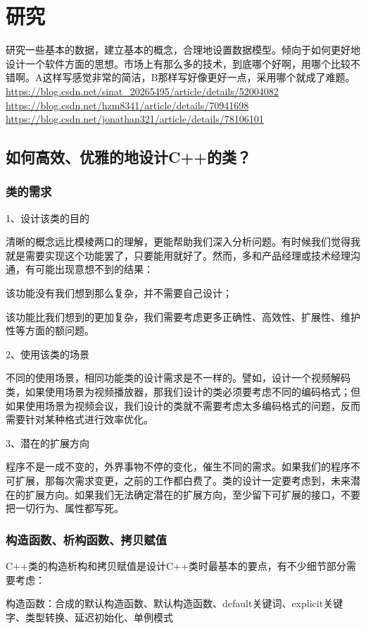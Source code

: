 \chapter{研究}
研究一些基本的数据，建立基本的概念，合理地设置数据模型。倾向于如何更好地设计一个软件方面的思想。市场上有那么多的技术，到底哪个好啊，用哪个比较不错啊。A这样写感觉非常的简洁，B那样写好像更好一点，采用哪个就成了难题。
\url{https://blog.csdn.net/sinat_20265495/article/details/52004082}
\url{https://blog.csdn.net/hzm8341/article/details/70941698}
\url{https://blog.csdn.net/jonathan321/article/details/78106101}

\section{如何高效、优雅的地设计C++的类？}
\subsection{类的需求}
1、设计该类的目的

清晰的概念远比模棱两口的理解，更能帮助我们深入分析问题。有时候我们觉得我就是需要实现这个功能罢了，只要能用就好了。然而，多和产品经理或技术经理沟通，有可能出现意想不到的结果：

该功能没有我们想到那么复杂，并不需要自己设计；

该功能比我们想到的更加复杂，我们需要考虑更多正确性、高效性、扩展性、维护性等方面的额问题。

2、使用该类的场景

不同的使用场景，相同功能类的设计需求是不一样的。譬如，设计一个视频解码类，如果使用场景为视频播放器，那我们设计的类必须要考虑不同的编码格式；但如果使用场景为视频会议，我们设计的类就不需要考虑太多编码格式的问题，反而需要针对某种格式进行效率优化。

3、潜在的扩展方向

程序不是一成不变的，外界事物不停的变化，催生不同的需求。如果我们的程序不可扩展，那每次需求变更，之前的工作都白费了。类的设计一定要考虑到，未来潜在的扩展方向。如果我们无法确定潜在的扩展方向，至少留下可扩展的接口，不要把一切行为、属性都写死。
\subsection{构造函数、析构函数、拷贝赋值}
C++类的构造析构和拷贝赋值是设计C++类时最基本的要点，有不少细节部分需要考虑：

构造函数：合成的默认构造函数、默认构造函数、default关键词、explicit关键字、类型转换、延迟初始化、单例模式


